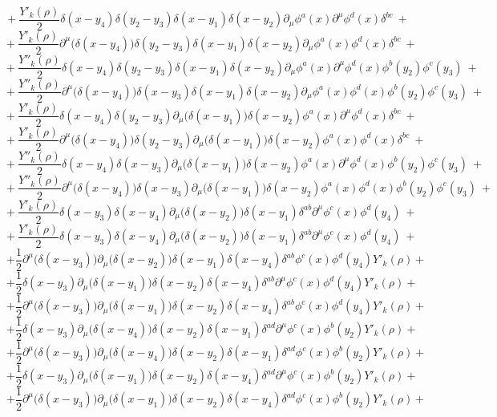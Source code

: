 $$+\ \frac{Y'_k(\rho)}{2}\delta(x - y_4)\delta(y_2 - y_3)\delta(x - y_1)\delta(x - y_2)\partial_\mu\phi^a(x)\partial^\mu\phi^d(x)\delta^{bc} \ +$$
$$+\ \frac{Y'_k(\rho)}{2}\partial^\mu\big(\delta(x - y_4)\big)\delta(y_2 - y_3)\delta(x - y_1)\delta(x - y_2)\partial_\mu\phi^a(x)\phi^d(x)\delta^{bc} \ +$$
$$+\ \frac{Y''_k(\rho)}{2}\delta(x - y_4)\delta(y_2 - y_3)\delta(x - y_1)\delta(x - y_2)\partial_\mu\phi^a(x)\partial^\mu\phi^d(x)\phi^b(y_2)\phi^c(y_3) \ +$$
$$+\ \frac{Y''_k(\rho)}{2}\partial^\mu\big(\delta(x - y_4)\big)\delta(x - y_3)\delta(x - y_1)\delta(x - y_2)\partial_\mu\phi^a(x)\phi^d(x)\phi^b(y_2)\phi^c(y_3) \ +$$
$$+\ \frac{Y'_k(\rho)}{2}\delta(x - y_4)\delta(y_2 - y_3)\partial_\mu\big(\delta(x - y_1)\big)\delta(x - y_2)\phi^a(x)\partial^\mu\phi^d(x)\delta^{bc} \ +$$
$$+\ \frac{Y'_k(\rho)}{2}\partial^\mu\big(\delta(x - y_4)\big)\delta(y_2 - y_3)\partial_\mu\big(\delta(x - y_1)\big)\delta(x - y_2)\phi^a(x)\phi^d(x)\delta^{bc} \ +$$
$$+\ \frac{Y''_k(\rho)}{2}\delta(x - y_4)\delta(x - y_3)\partial_\mu\big(\delta(x - y_1)\big)\delta(x - y_2)\phi^a(x)\partial^\mu\phi^d(x)\phi^b(y_2)\phi^c(y_3) \ +$$
$$+\ \frac{Y''_k(\rho)}{2}\partial^\mu\big(\delta(x - y_4)\big)\delta(x - y_3)\partial_\mu\big(\delta(x - y_1)\big)\delta(x - y_2)\phi^a(x)\phi^d(x)\phi^b(y_2)\phi^c(y_3) \ +$$
$$+\ \frac{Y'_k(\rho)}{2}\delta(x - y_3)\delta(x - y_4)\partial_\mu\big(\delta(x - y_2)\big)\delta(x - y_1)\delta^{ab}\partial^\mu\phi^c(x)\phi^d(y_4) \ +$$
$$+\ \frac{Y'_k(\rho)}{2}\delta(x - y_3)\delta(x - y_4)\partial_\mu\big(\delta(x - y_2)\big)\delta(x - y_1)\delta^{ab}\partial^\mu\phi^c(x)\phi^d(y_4) \ +$$
$$+ \frac{1}{2}\partial^\mu\big(\delta(x - y_3)\big)\partial_\mu\big(\delta(x - y_2)\big)\delta(x - y_1)\delta(x- y_4)\delta^{ab}\phi^c(x)\phi^d(y_4)Y'_k(\rho) + $$
$$+ \frac{1}{2}\delta(x - y_3)\partial_\mu\big(\delta(x - y_1)\big)\delta(x - y_2)\delta(x- y_4)\delta^{ab}\partial^\mu\phi^c(x)\phi^d(y_4)Y'_k(\rho) + $$
$$+ \frac{1}{2}\partial^\mu\big(\delta(x - y_3)\big)\partial_\mu\big(\delta(x - y_1)\big)\delta(x - y_2)\delta(x- y_4)\delta^{ab}\phi^c(x)\phi^d(y_4)Y'_k(\rho) + $$
$$+ \frac{1}{2}\delta(x - y_3)\partial_\mu\big(\delta(x - y_4)\big)\delta(x - y_2)\delta(x- y_1)\delta^{ad}\partial^\mu\phi^c(x)\phi^b(y_2)Y'_k(\rho) + $$
$$+ \frac{1}{2}\partial^\mu\big(\delta(x - y_3)\big)\partial_\mu\big(\delta(x - y_4)\big)\delta(x - y_2)\delta(x- y_1)\delta^{ad}\phi^c(x)\phi^b(y_2)Y'_k(\rho) + $$
$$+ \frac{1}{2}\delta(x - y_3)\partial_\mu\big(\delta(x - y_1)\big)\delta(x - y_2)\delta(x- y_4)\delta^{ad}\partial^\mu\phi^c(x)\phi^b(y_2)Y'_k(\rho) + $$
$$+ \frac{1}{2}\partial^\mu\big(\delta(x - y_3)\big)\partial_\mu\big(\delta(x - y_1)\big)\delta(x - y_2)\delta(x- y_4)\delta^{ad}\phi^c(x)\phi^b(y_2)Y'_k(\rho) + $$
